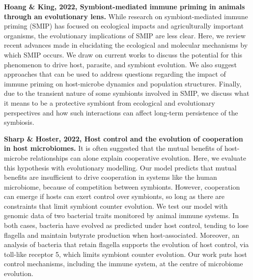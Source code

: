 \documentclass[11pt]{article}
\begin{document}
\begin{sloppypar}
\par

\textbf{Hoang & King, 2022, Symbiont-mediated immune priming in animals through an evolutionary lens.} \newline
While research on symbiont-mediated immune priming (SMIP) has focused on ecological impacts and agriculturally important organisms, the evolutionary implications of SMIP are less clear. 
Here, we review recent advances made in elucidating the ecological and molecular mechanisms by which SMIP occurs. 
We draw on current works to discuss the potential for this phenomenon to drive host, parasite, and symbiont evolution. 
We also suggest approaches that can be used to address questions regarding the impact of immune priming on host-microbe dynamics and population structures. 
Finally, due to the transient nature of some symbionts involved in SMIP, we discuss what it means to be a protective symbiont from ecological and evolutionary perspectives and how such interactions can affect long-term persistence of the symbiosis. 

\par

\textbf{Sharp & Hoster, 2022, Host control and the evolution of cooperation in host microbiomes.} \newline
It is often suggested that the mutual benefits of host-microbe relationships can alone explain cooperative evolution. 
Here, we evaluate this hypothesis with evolutionary modelling. 
Our model predicts that mutual benefits are insufficient to drive cooperation in systems like the human microbiome, because of competition between symbionts. 
However, cooperation can emerge if hosts can exert control over symbionts, so long as there are constraints that limit symbiont counter evolution. 
We test our model with genomic data of two bacterial traits monitored by animal immune systems. 
In both cases, bacteria have evolved as predicted under host control, tending to lose flagella and maintain butyrate production when host-associated. 
Moreover, an analysis of bacteria that retain flagella supports the evolution of host control, via toll-like receptor 5, which limits symbiont counter evolution. 
Our work puts host control mechanisms, including the immune system, at the centre of microbiome evolution. 

\par


\end{sloppypar}
\end{document}
